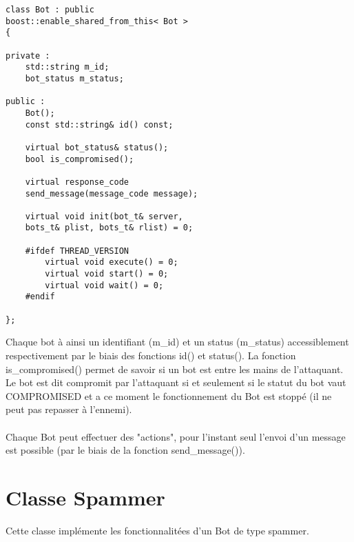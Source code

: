 \documentclass[11pt]{article}
\begin{document}
\begin{minipage}[c]{.46\linewidth}
\begin{verbatim} 
class Bot : public 
boost::enable_shared_from_this< Bot >
{

private :
	std::string m_id;
	bot_status m_status;

public :
	Bot();
	const std::string& id() const;
	
	virtual bot_status& status();
	bool is_compromised();
	
	virtual response_code 
	send_message(message_code message);
	
	virtual void init(bot_t& server, 
	bots_t& plist, bots_t& rlist) = 0;
	
	#ifdef THREAD_VERSION
		virtual void execute() = 0;
		virtual void start() = 0;
		virtual void wait() = 0;
	#endif
	
};
\end{verbatim}	
\end{minipage} \hfill
\begin{minipage}[c]{.46\linewidth}
Chaque bot à ainsi un identifiant (m\_id) et un status (m\_status) accessiblement respectivement par le biais des fonctions id() et status(). La fonction is\_compromised() permet de savoir si un bot est entre les mains de l'attaquant. Le bot est dit compromit par l'attaquant si et seulement si le statut du bot vaut COMPROMISED et a ce moment le fonctionnement du Bot est stoppé (il ne peut pas repasser à l'ennemi).\\\\Chaque Bot peut effectuer des "actions", pour l'instant seul l'envoi d'un message est possible (par le biais de la fonction send\_message()).
\end{minipage}

\newpage
\section{Classe Spammer}
Cette classe implémente les fonctionnalitées d'un Bot de type spammer.\\
\end{document}
